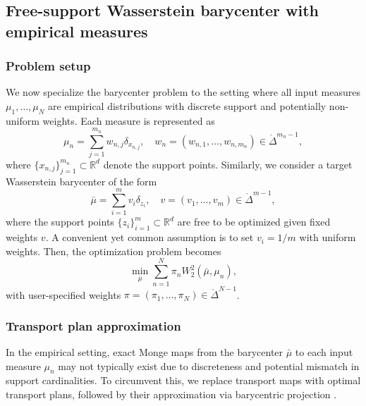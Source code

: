 \documentclass[11pt]{article}
\newcommand{\bbR}{\mathbb{R}}
\begin{document}
\subsection{Free-support Wasserstein barycenter with empirical measures}
\subsubsection{Problem setup}
We now specialize the barycenter problem to the setting where all input measures $\mu_1, \ldots, \mu_N$ are empirical distributions with discrete support and potentially non-uniform weights. Each measure is represented as 
\begin{equation*}
    \mu_n = \sum_{j=1}^{m_n} w_{n,j} \delta_{x_{n,j}},\quad w_n = (w_{n,1}, \ldots, w_{n,m_n}) \in \mathring{\Delta}^{m_n-1},
\end{equation*}
where $\lbrace x_{n,j}\rbrace_{j=1}^{m_n} \subset \bbR^d$ denote the support points. Similarly, we consider a target Wasserstein barycenter of the form
\begin{equation*}
    \bar{\mu} = \sum_{i=1}^m v_i \delta_{z_i},\quad v=(v_1, \ldots, v_m) \in \mathring{\Delta}^{m-1},
\end{equation*}
where the support points $\lbrace z_i\rbrace_{i=1}^m \subset \bbR^d$ are free to be optimized given fixed weights $v$. A convenient yet common assumption is to set $v_i = 1/m$ with uniform weights. Then, the optimization problem becomes 
\begin{equation}
    \min_{\bar{\mu}}  \sum_{n=1}^N \pi_n W_2^2(\bar{\mu}, \mu_n),
\end{equation}
with user-specified weights $\pi = (\pi_1, \ldots, \pi_N) \in \mathring{\Delta}^{N-1}$. 

\subsubsection{Transport plan approximation}
In the empirical setting, exact Monge maps from the barycenter $\bar{\mu}$ to each input measure $\mu_n$ may not typically exist due to discreteness and potential mismatch in support cardinalities. To circumvent this, we replace transport maps with optimal transport plans, followed by their approximation via barycentric projection \citep{peyre_2019_ComputationalOptimalTransport}.
\end{document}

